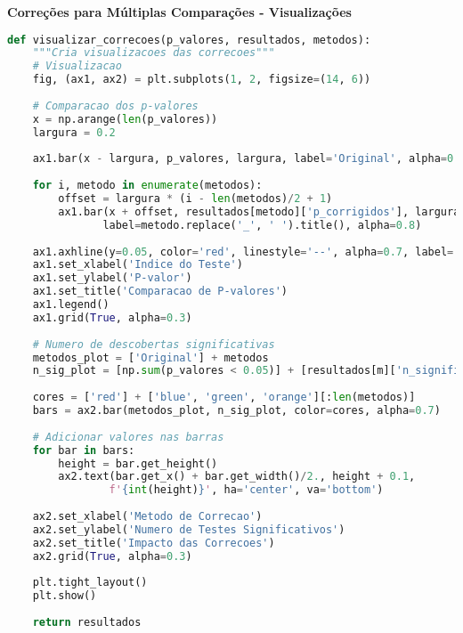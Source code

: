\begin{examplebox}
\textbf{Correções para Múltiplas Comparações - Visualizações}

\begin{lstlisting}[language=Python]
def visualizar_correcoes(p_valores, resultados, metodos):
    """Cria visualizacoes das correcoes"""
    # Visualizacao
    fig, (ax1, ax2) = plt.subplots(1, 2, figsize=(14, 6))
    
    # Comparacao dos p-valores
    x = np.arange(len(p_valores))
    largura = 0.2
    
    ax1.bar(x - largura, p_valores, largura, label='Original', alpha=0.8)
    
    for i, metodo in enumerate(metodos):
        offset = largura * (i - len(metodos)/2 + 1)
        ax1.bar(x + offset, resultados[metodo]['p_corrigidos'], largura, 
               label=metodo.replace('_', ' ').title(), alpha=0.8)
    
    ax1.axhline(y=0.05, color='red', linestyle='--', alpha=0.7, label='alpha = 0.05')
    ax1.set_xlabel('Indice do Teste')
    ax1.set_ylabel('P-valor')
    ax1.set_title('Comparacao de P-valores')
    ax1.legend()
    ax1.grid(True, alpha=0.3)
    
    # Numero de descobertas significativas
    metodos_plot = ['Original'] + metodos
    n_sig_plot = [np.sum(p_valores < 0.05)] + [resultados[m]['n_significativos'] for m in metodos]
    
    cores = ['red'] + ['blue', 'green', 'orange'][:len(metodos)]
    bars = ax2.bar(metodos_plot, n_sig_plot, color=cores, alpha=0.7)
    
    # Adicionar valores nas barras
    for bar in bars:
        height = bar.get_height()
        ax2.text(bar.get_x() + bar.get_width()/2., height + 0.1,
                f'{int(height)}', ha='center', va='bottom')
    
    ax2.set_xlabel('Metodo de Correcao')
    ax2.set_ylabel('Numero de Testes Significativos')
    ax2.set_title('Impacto das Correcoes')
    ax2.grid(True, alpha=0.3)
    
    plt.tight_layout()
    plt.show()
    
    return resultados
\end{lstlisting}
\end{examplebox}

